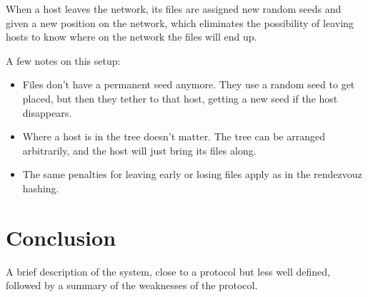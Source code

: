 \documentclass[twocolumn]{article}
\begin{document}
When a host leaves the network, its files are assigned new random seeds and given a new position on the network, which eliminates the possibility of leaving hosts to know where on the network the files will end up.

A few notes on this setup:
\begin{itemize}
	\item Files don't have a permanent seed anymore. They use a random seed to get placed, but then they tether to that host, getting a new seed if the host disappears.
	\item Where a host is in the tree doesn't matter. The tree can be arranged arbitrarily, and the host will just bring its files along.
	\item The same penalties for leaving early or losing files apply as in the rendezvouz hashing.
\end{itemize}

\section{Conclusion}
A brief description of the system, close to a protocol but less well defined, followed by a summary of the weaknesses of the protocol.
\end{document}
